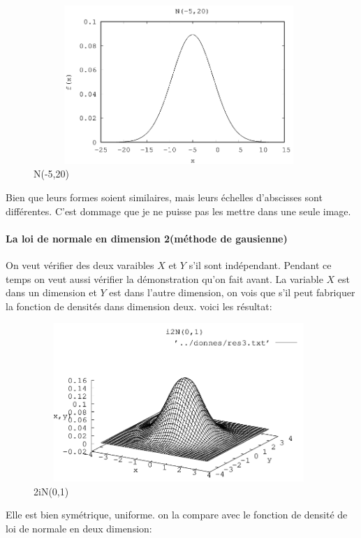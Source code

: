 \documentclass[]{article}
\let\oldparagraph\paragraph
\renewcommand{\paragraph}[1]{\oldparagraph{#1}\mbox{}}
\begin{document}
\begin{figure}
	\centering
	\includegraphics[height=6cm,width=11cm]{images/N-520.png}
	\caption{N(-5,20)}
	\label{fig12}
\end{figure}
Bien que leurs formes soient similaires, mais leurs échelles d'abscisses
sont différentes. C'est dommage que je ne puisse pas les mettre dans une
seule image.

\hypertarget{header-n524}{%
\paragraph{La loi de normale en dimension 2(méthode de
gausienne)}\label{header-n524}}

On veut vérifier des deux varaibles \(X\) et \(Y\) s'il sont
indépendant. Pendant ce temps on veut aussi vérifier la démonstration qu'on fait
avant. La variable \(X\) est dans un dimension et \(Y\) est dans l'autre
dimension, on vois que s'il peut fabriquer la fonction de densités dans
dimension deux. voici les résultat:\\

\begin{figure}
	\centering
	\includegraphics[height=6cm,width=11cm]{images/2iN01.png}
	\caption{2iN(0,1)}
	\label{fig13}
\end{figure}
Elle est bien symétrique, uniforme. on la compare avec le fonction de
densité de loi de normale en deux dimension:\\
\end{document}
